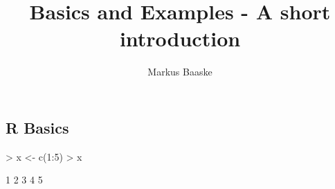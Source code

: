 \documentclass[a4paper]{article}
\title{\proglang{R} Basics and Examples - A short introduction}
\author{Markus Baaske}
\begin{document}
\maketitle

\subsection{R Basics}
\begin{Schunk}
\begin{Sinput}
> x <- c(1:5)
> x
\end{Sinput}
\begin{Soutput}
[1] 1 2 3 4 5
\end{Soutput}
\end{Schunk}
\end{document}
